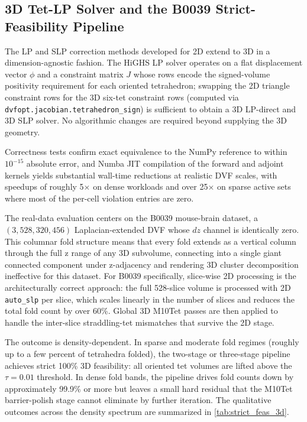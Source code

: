 \documentclass[lettersize,journal]{IEEEtran}
\begin{document}
\subsection{3D Tet-LP Solver and the B0039 Strict-Feasibility Pipeline}
\label{sec:3d_solver}

The LP and SLP correction methods developed for 2D extend to 3D in a dimension-agnostic fashion. The HiGHS LP solver operates on a flat displacement vector $\phi$ and a constraint matrix $J$ whose rows encode the signed-volume positivity requirement for each oriented tetrahedron; swapping the 2D triangle constraint rows for the 3D six-tet constraint rows (computed via \texttt{dvfopt.jacobian.tetrahedron\_sign}) is sufficient to obtain a 3D LP-direct and 3D SLP solver. No algorithmic changes are required beyond supplying the 3D geometry.

Correctness tests confirm exact equivalence to the NumPy reference to within $10^{-15}$ absolute error, and Numba JIT compilation of the forward and adjoint kernels yields substantial wall-time reductions at realistic DVF scales, with speedups of roughly 5$\times$ on dense workloads and over 25$\times$ on sparse active sets where most of the per-cell violation entries are zero.

The real-data evaluation centers on the B0039 mouse-brain dataset, a $(3, 528, 320, 456)$ Laplacian-extended DVF whose $dz$ channel is identically zero. This columnar fold structure means that every fold extends as a vertical column through the full z range of any 3D subvolume, connecting into a single giant connected component under z-adjacency and rendering 3D cluster decomposition ineffective for this dataset. For B0039 specifically, slice-wise 2D processing is the architecturally correct approach: the full 528-slice volume is processed with 2D \texttt{auto\_slp} per slice, which scales linearly in the number of slices and reduces the total fold count by over 60\%. Global 3D M10Tet passes are then applied to handle the inter-slice straddling-tet mismatches that survive the 2D stage.

The outcome is density-dependent. In sparse and moderate fold regimes (roughly up to a few percent of tetrahedra folded), the two-stage or three-stage pipeline achieves strict 100\% 3D feasibility: all oriented tet volumes are lifted above the $\tau = 0.01$ threshold. In dense fold bands, the pipeline drives fold counts down by approximately 99.9\% or more but leaves a small hard residual that the M10Tet barrier-polish stage cannot eliminate by further iteration. The qualitative outcomes across the density spectrum are summarized in \autoref{tab:strict_feas_3d}.
\end{document}
